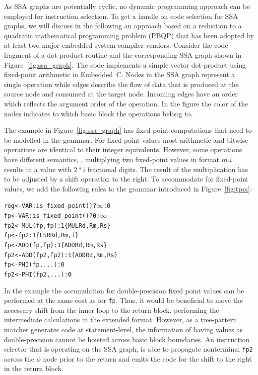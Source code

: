 As SSA graphs are potentially cyclic, no dynamic programming approach
can be employed for instruction selection.  To get a handle on code
selection for SSA graphs, we will discuss in the following an approach
based on a reduction to a quadratic mathematical programming problem
(PBQP) that has been adopted by at least two major embedded system
compiler vendors.  Consider the code fragment of a dot-product routine
and the corresponding SSA graph shown in Figure~\ref{fig:ssa_graph}.
The code implements a simple vector dot-product using fixed-point
arithmetic in Embedded~C.  Nodes in the SSA graph represent a single
operation while edges describe the flow of data that is produced at the
source node and consumed at the target node. Incoming edges
have an order which reflects the argument order of the operation. In
the figure the color of the nodes indicates to which basic block the
operations belong to.

The example in Figure~\ref{fig:ssa_graph} has fixed-point computations
that need to be modelled in the grammar. For fixed-point values most
arithmetic and bitwise operations are identical to their integer
equivalents. However, some operations have different semantics, \eg,
multiplying two fixed-point values in format $m.i$ results in a value
with $2*i$ fractional digits. The result of the multiplication has to
be adjusted by a shift operation to the right. To accommodate for
fixed-point values, we add the following rules to the grammar
introduced in Figure~\ref{fig:tpm}:
\begin{alltt}
   reg <- VAR : is\_fixed_point() ? \(\infty\) : 0
   fp  <- VAR : is\_fixed_point() ? 0 : \(\infty\)
   fp2 <- MUL(fp, fp)   : 1   \{ MUL Rd, Rm, Rs \}
   fp  <- fp2           : 1   \{ LSR Rd, Rm, i  \}
   fp  <- ADD(fp, fp)   : 1   \{ ADD Rd, Rm, Rs \}
   fp2 <- ADD(fp2, fp2) : 1   \{ ADD Rd, Rm, Rs \}
   fp  <- PHI(fp, ...) : 0 
   fp2 <- PHI(fp2, ...) : 0 
\end{alltt}

In the example the accumulation for double-precision fixed
point values can be performed at the same cost as for \texttt{fp}. Thus, it would be
beneficial to move the necessary shift from the inner loop to the
return block, performing the intermediate calculations in the extended
format. However, as a tree-pattern matcher generates code at 
statement-level, the information of having values as double-precision
cannot be hoisted across basic block boundaries.
An instruction selector that is operating on the SSA graph, is able to propagate 
nonterminal \texttt{fp2} across the $\phi$ node prior to the return 
and emits the code for the shift to the right in the return block.

